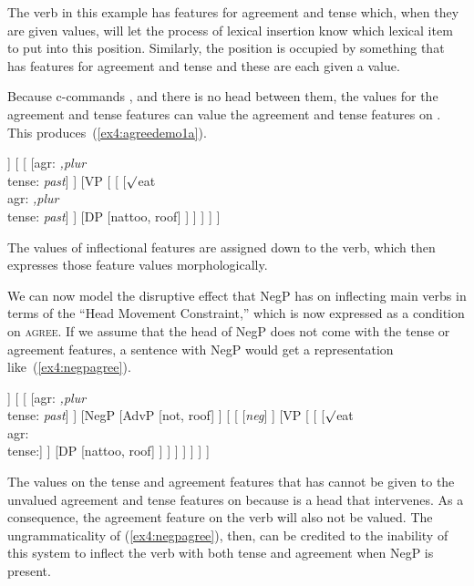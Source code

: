 The verb in this example has features for agreement and tense which, when they are given values, will let the process of lexical insertion know which lexical item to put into this position. Similarly, the  position is occupied by something that has features for agreement and tense and these are each given a value.

Because  c-commands , and there is no head between them, the values for the agreement and tense features can value the agreement and tense features on . This produces~(\ref{ex4:agreedemo1a}).
\begin{exe}
\ex \label{ex4:agreedemo1a}
\small
\begin{forest}
[TP
	[DP [they, roof]]
	[ 
		[ [agr: \emph{,plur}\\ tense: \emph{past}] ]
		[VP [
			[ [$\surd$eat\\ agr: \emph{,plur}\\ tense: \emph{past}] ]
			[DP [nattoo, roof] ]
		] ]
	]
]
\end{forest}
\end{exe}
The values of inflectional features are assigned down to the verb, which then expresses those feature values morphologically.

We can now model the disruptive effect that NegP has on inflecting main verbs in terms of the ``Head Movement Constraint,'' which is now expressed as a condition on \textsc{agree}. If we assume that the head of NegP does not come with the tense or agreement features, a sentence with NegP would get a representation like~(\ref{ex4:negpagree}). %
\begin{exe}
\ex \label{ex4:negpagree}
\small
\begin{forest}
[TP
	[DP [they, roof]]
	[ 
		[ [agr: \emph{,plur}\\ tense: \emph{past}] ]
		[NegP
			[AdvP [not, roof] ]
			[
				[ [\emph{neg}] ]
				[VP [
					[ [$\surd$eat\\ agr: \\tense:] ]
					[DP [nattoo, roof] ]
				] ]
			 ]
		 ]
	]
]
\end{forest}
\end{exe}
The values on the tense and agreement features that  has cannot be given to the unvalued agreement and tense features on  because  is a head that intervenes. As a consequence, the agreement feature on the verb will also not be valued. The ungrammaticality of (\ref{ex4:negpagree}), then, can be credited to the inability of this system to inflect the verb with both tense and agreement when NegP is present.

